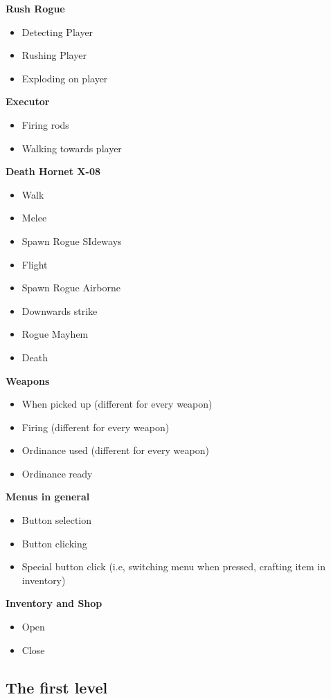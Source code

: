 \documentclass[../Main.tex]{subfiles}
\begin{document}
\textbf{Rush Rogue}
\begin{itemize}
	\item Detecting Player
	\item Rushing Player
	\item Exploding on player
\end{itemize}

\textbf{Executor}
\begin{itemize}
	\item Firing rods
	\item Walking towards player
\end{itemize}

\textbf{Death Hornet X-08}
\begin{itemize}
	\item Walk
	\item Melee
	\item Spawn Rogue SIdeways
	\item Flight
	\item Spawn Rogue Airborne
	\item Downwards strike
	\item Rogue Mayhem
	\item Death
\end{itemize}

\textbf{Weapons}
\begin{itemize}
	\item When picked up (different for every weapon)
	\item Firing (different for every weapon)
	\item Ordinance used (different for every weapon)
	\item Ordinance ready
\end{itemize}

\textbf{Menus in general}
\begin{itemize}
	\item Button selection
	\item Button clicking
	\item Special button click (i.e, switching menu when pressed, crafting item in inventory)
\end{itemize}


\textbf{Inventory and Shop}
\begin{itemize}
	\item Open
	\item Close
\end{itemize}

\subsection{The first level}
\end{document}
